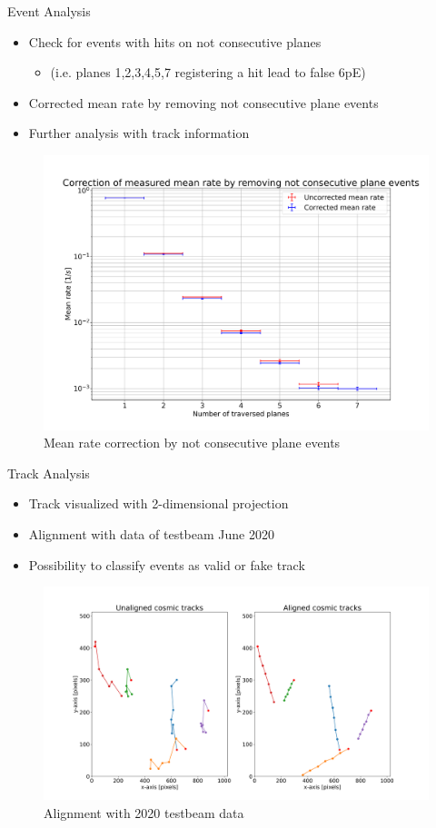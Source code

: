 \begin{frame}{Event Analysis}
  \begin{itemize}
    \item Check for events with hits on not consecutive planes
    \begin{itemize}
      \item (i.e. planes 1,2,3,4,5,7 registering a hit lead to false 6pE)
    \end{itemize}
    \item Corrected mean rate by removing not consecutive plane events
    \item Further analysis with track information
  \end{itemize}
  \begin{figure}[H]
    \centering
    \includegraphics[width=.6\textwidth]{rate_correction}
    \caption{Mean rate correction by not consecutive plane events}
  \end{figure}
\end{frame}

\begin{frame}{Track Analysis}
  \begin{itemize}
    \item Track visualized with 2-dimensional projection
    \item Alignment with data of testbeam June 2020
    \item Possibility to classify events as valid or fake track
  \end{itemize}
  \begin{figure}[H]
    \centering
    \includegraphics[width=.8\textwidth]{track_visual}
    \caption{Alignment with 2020 testbeam data}
  \end{figure}
\end{frame}

